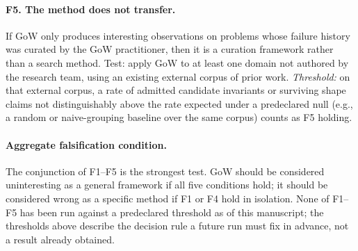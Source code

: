 \documentclass[11pt]{article}
\theoremstyle{gowthm}
\theoremstyle{gowplain}
\begin{document}
\paragraph{F5. The method does not transfer.}
If GoW only produces interesting observations on problems whose failure history
was curated by the GoW practitioner, then it is a curation framework rather than
a search method. Test: apply GoW to at least one domain not authored by the
research team, using an existing external corpus of prior work.
\emph{Threshold:} on that external corpus, a rate of admitted candidate
invariants or surviving shape claims not distinguishably above the rate
expected under a predeclared null (e.g., a random or naive-grouping baseline
over the same corpus) counts as F5 holding.

\paragraph{Aggregate falsification condition.}
The conjunction of F1--F5 is the strongest test. GoW should be considered
uninteresting as a general framework if all five conditions hold; it should be
considered wrong as a specific method if F1 or F4 hold in isolation. None of
F1--F5 has been run against a predeclared threshold as of this manuscript;
the thresholds above describe the decision rule a future run must fix in
advance, not a result already obtained.
\end{document}
